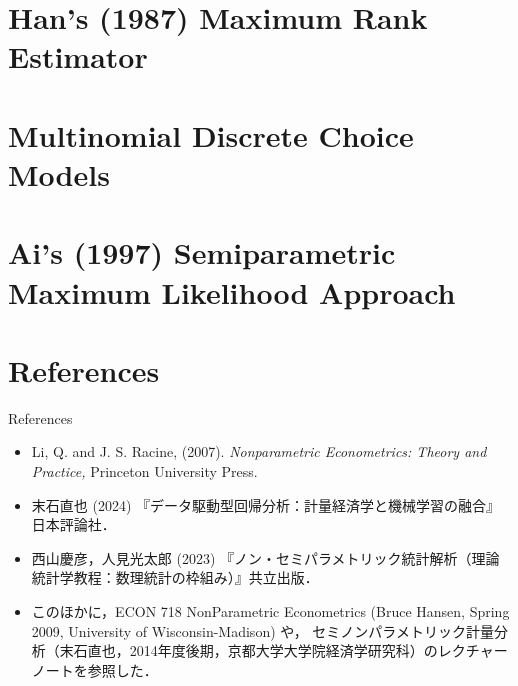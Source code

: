 \documentclass[xcolor=svgnames,dvipdfmx,cjk]{beamer}
\theoremstyle{example}
\begin{document}
\section{Han's (1987) Maximum Rank Estimator}
\begin{frame}
  \tableofcontents[currentsection]
\end{frame}









\section{Multinomial Discrete Choice Models}\begin{frame}
  \tableofcontents[currentsection]
\end{frame}









\section{Ai's (1997) Semiparametric Maximum Likelihood Approach}
\begin{frame}
  \tableofcontents[currentsection]
\end{frame}










\section{References}
\begin{frame}
  \tableofcontents[currentsection]
\end{frame}

\begin{frame}{References}
  \begin{itemize}
    \item Li, Q. and J. S. Racine, (2007). 
          \textit{Nonparametric Econometrics: Theory and Practice,} 
          Princeton University Press.
    \item 末石直也 (2024) 『データ駆動型回帰分析：計量経済学と機械学習の融合』日本評論社．
    \item 西山慶彦，人見光太郎 (2023) 『ノン・セミパラメトリック統計解析（理論統計学教程：数理統計の枠組み）』共立出版．
    \item このほかに，ECON 718 NonParametric Econometrics (Bruce Hansen, Spring 2009, University of Wisconsin-Madison) や，
          セミノンパラメトリック計量分析（末石直也，2014年度後期，京都大学大学院経済学研究科）のレクチャーノートを参照した． 
  \end{itemize}
\end{frame}
\end{document}
